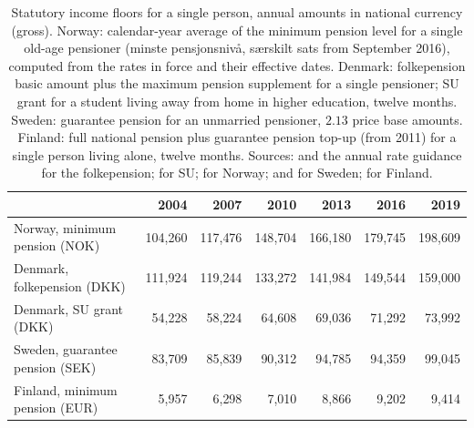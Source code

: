 \begin{table}[t]
\centering\small
\caption{Statutory income floors for a single person, annual amounts in national currency (gross). Norway: calendar-year average of the minimum pension level for a single old-age pensioner (minste pensjonsnivå, særskilt sats from September 2016), computed from the rates in force and their effective dates. Denmark: folkepension basic amount plus the maximum pension supplement for a single pensioner; SU grant for a student living away from home in higher education, twelve months. Sweden: guarantee pension for an unmarried pensioner, $2.13$ price base amounts. Finland: full national pension plus guarantee pension top-up (from 2011) for a single person living alone, twelve months. Sources: \citet{DKTIMES} and the annual rate guidance \citep{DKVejledning2010} for the folkepension; \citet{DKSUsatser} for SU; \citet{NOMeld2016,NOMeld2020,NOMeld2022} for Norway; \citet{SEPensionsmyndigheten} and \citet{SCBpbb} for Sweden; \citet{ETK2024} for Finland.}\label{tab:floors}
\begin{tabular}{lrrrrrr}
\toprule
 & 2004 & 2007 & 2010 & 2013 & 2016 & 2019\\
\midrule
Norway, minimum pension (NOK) & 104{,}260 & 117{,}476 & 148{,}704 & 166{,}180 & 179{,}745 & 198{,}609\\
Denmark, folkepension (DKK) & 111{,}924 & 119{,}244 & 133{,}272 & 141{,}984 & 149{,}544 & 159{,}000\\
Denmark, SU grant (DKK) & 54{,}228 & 58{,}224 & 64{,}608 & 69{,}036 & 71{,}292 & 73{,}992\\
Sweden, guarantee pension (SEK) & 83{,}709 & 85{,}839 & 90{,}312 & 94{,}785 & 94{,}359 & 99{,}045\\
Finland, minimum pension (EUR) & 5{,}957 & 6{,}298 & 7{,}010 & 8{,}866 & 9{,}202 & 9{,}414\\
\bottomrule
\end{tabular}
\end{table}
